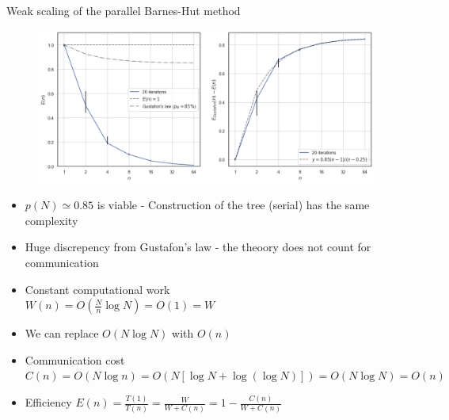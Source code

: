\documentclass[8pt]{beamer}
\begin{document}
\begin{frame}{Weak scaling of the parallel Barnes-Hut method}

    \begin{figure}
        \centering
        \includegraphics[width=.8\textwidth]{img/weakscaling.png}
    \end{figure}

    \begin{itemize}
        \item $p(N) \simeq 0.85$ is viable - {\small Construction of the tree (serial) has the same complexity}
        \item Huge discrepency from Gustafon's law - {\small the theoory does not count for communication}
        \item Constant computational work
            \\ \hspace{.25\textwidth} $W(n) = O(\frac{N}{n} \log N) = O(1) = W$
        \item We can replace $O(N \log N)$ with $O(n)$
        \item Communication cost
            \\ \hspace{.05\textwidth} $C(n) = O(N \log n) = O(N [\log N + \log(\log N)]) = O(N \log N) = O(n)$
        \item Efficiency $E(n) = \frac{T(1)}{T(n)} = \frac{W}{W + C(n)} = 1 - \frac{C(n)}{W + C(n)}$
    \end{itemize}

\end{frame}
\end{document}
